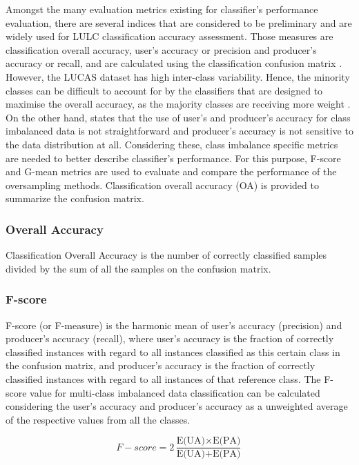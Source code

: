 \documentclass[parskip=full]{scrartcl}
\begin{document}
Amongst the many evaluation metrics existing for classifier's performance
evaluation, there are several indices that are considered to be preliminary and
are widely used for LULC classification accuracy assessment. Those measures are
classification overall accuracy, user's accuracy or precision and
producer's accuracy or recall,  and are calculated using the classification
confusion matrix \cite{Liu2007}. However, the LUCAS dataset has high
inter-class variability. Hence, the minority classes can be difficult to
account for by the classifiers that are designed to maximise the overall
accuracy, as the majority classes are receiving more weight \cite{Inglada2017}.
On the other hand, \cite{He2008} states that the use of user's and producer's
accuracy for class imbalanced data is not straightforward and producer's
accuracy is not sensitive to the data distribution at all. Considering these,
class imbalance specific metrics are needed to better describe classifier's
performance. For this purpose, F-score and G-mean metrics are used to evaluate
and compare the performance of the oversampling methods. Classification overall
accuracy (OA) is provided to summarize the confusion matrix.

\subsubsection{Overall Accuracy}

Classification Overall Accuracy is the number of correctly classified samples
divided by the sum of all the samples on the confusion matrix.

\subsubsection{F-score}

F-score (or F-measure) is the harmonic mean of user's accuracy (precision) and
producer's accuracy (recall), where user's accuracy is the fraction of
correctly classified instances with regard to all instances classified as this
certain class in the confusion matrix, and producer's accuracy is the fraction
of  correctly classified instances with regard to all instances of that
reference class. The F-score value for multi-class imbalanced data
classification can be calculated considering the user's accuracy and producer's
accuracy as a unweighted average of the respective values from all the classes.

\[
F{-}score=2\frac{\text{E(UA)} \times \text{E(PA)}}{\text{E(UA)} + \text{E(PA)}}
\]
\end{document}
